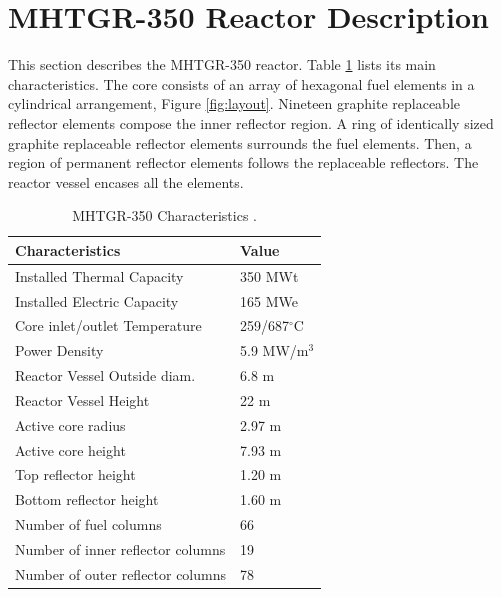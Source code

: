 \section{MHTGR-350 Reactor Description}
\label{sec:ch3-mhtgr}

This section describes the \gls{MHTGR}-350 reactor.
Table \ref{tab:maincharac} lists its main characteristics.
The core consists of an array of hexagonal fuel elements in a cylindrical arrangement, Figure \ref{fig:layout}.
Nineteen graphite replaceable reflector elements compose the inner reflector region.
A ring of identically sized graphite replaceable reflector elements surrounds the fuel elements.
Then, a region of permanent reflector elements follows the replaceable reflectors.
The reactor vessel encases all the elements.

\begin{table}[htbp!]
  \centering
    \caption{MHTGR-350 Characteristics \cite{oecd_nea_benchmark_2017}.}
  \begin{tabular}{ll}
  \toprule
  Characteristics                   & Value               \\ \midrule
  Installed Thermal Capacity        & 350 MWt             \\
  Installed Electric Capacity       & 165 MWe             \\
  Core inlet/outlet Temperature     & 259/687$^{\circ}$C  \\
  Power Density                     & 5.9 MW/m$^3$        \\
  Reactor Vessel Outside diam.      & 6.8 m               \\
  Reactor Vessel Height             & 22 m                \\
  Active core radius                & 2.97 m              \\
  Active core height                & 7.93 m              \\
  Top reflector height              & 1.20 m              \\
  Bottom reflector height           & 1.60 m              \\
  Number of fuel columns            & 66                  \\
  Number of inner reflector columns & 19                  \\
  Number of outer reflector columns & 78                  \\
  \bottomrule
  \end{tabular}
  \label{tab:maincharac}
\end{table}

